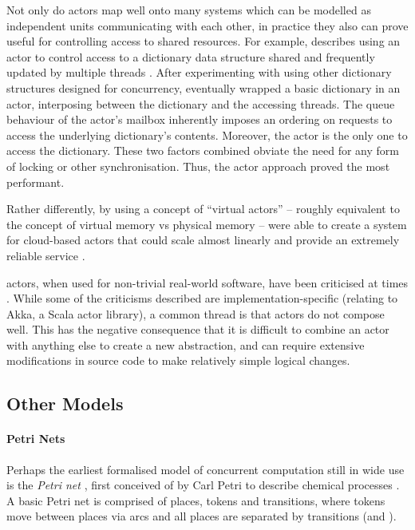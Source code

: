 Not only do \glspl{actor} map well onto many systems which can be modelled as independent units communicating with each other, in practice they also can prove useful for controlling access to shared resources.  For example, \citeauthor{Terrell2018} describes using an \gls{actor} to control access to a dictionary data structure shared and frequently updated by multiple threads \cite{Terrell2018}.  After experimenting with using other dictionary structures designed for concurrency, \citeauthor{Terrell2018} eventually wrapped a basic dictionary in an \gls{actor}, interposing between the dictionary and the accessing threads.  The queue behaviour of the \gls{actor}'s mailbox inherently imposes an ordering on requests to access the underlying dictionary's contents.   Moreover, the \gls{actor} is the only one to access the dictionary.  These two factors combined obviate the need for any form of locking or other synchronisation.  Thus, the \gls{actor} approach proved the most performant.

Rather differently, by using a concept of ``virtual actors'' -- roughly equivalent to the concept of virtual memory vs physical memory -- \citeauthor{Bernstein2016} were able to create a system for cloud-based actors that could scale almost linearly and provide an extremely reliable service \cite{Bernstein2016}.

\Glspl{actor}, when used for non-trivial real-world software, have been criticised at times \eg{} \cite{Welsh2013,Stucchio2013}.  While some of the criticisms described are implementation-specific (relating to Akka, a Scala \gls{actor} library), a common thread is that \glspl{actor} do not compose well.  This has the negative consequence that it is difficult to combine an \gls{actor} with anything else to create a new abstraction, and can require extensive modifications in source code to make relatively simple logical changes.

\subsection{\label{sec:back:othermodels}Other Models}

\paragraph{Petri Nets}
Perhaps the earliest formalised model of concurrent computation still in wide use is the \emph{Petri net} \cite{Dennis2011}, first conceived of by Carl Petri to describe chemical processes \cite{Petri2008}.  A basic Petri net is comprised of places, tokens and transitions, where tokens move between places via arcs and all places are separated by transitions (and \viceversa).


